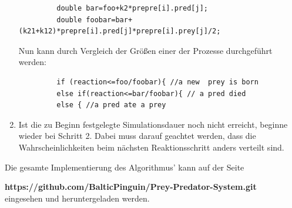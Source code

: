 \documentclass[11pt]{article}
\begin{document}
\begin{enumerate}
\begin{verbatim}
         double bar=foo+k2*prepre[i].pred[j];
         double foobar=bar+(k21+k12)*prepre[i].pred[j]*prepre[i].prey[j]/2;
        \end{verbatim}
     Nun kann durch Vergleich der Größen einer der Prozesse durchgeführt werden:
        \begin{verbatim}
         if (reaction<=foo/foobar){ //a new  prey is born
         else if(reaction<=bar/foobar){ // a pred died
         else { //a pred ate a prey
        \end{verbatim}
   \item Ist die zu Beginn festgelegte Simulationsdauer noch nicht erreicht, beginne wieder bei Schritt 2. Dabei muss darauf geachtet werden, dass die Wahrscheinlichkeiten beim nächsten Reaktionsschritt anders verteilt sind.
\end{enumerate}
Die gesamte Implementierung des Algorithmus' kann auf der Seite

 \textbf{https://github.com/BalticPinguin/Prey-Predator-System.git} \\
eingesehen und heruntergeladen werden.
\end{document}
